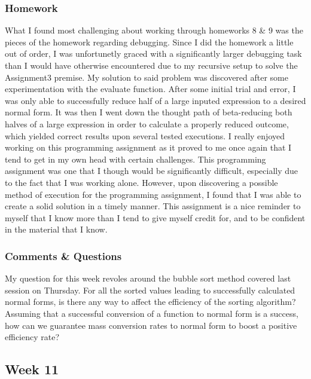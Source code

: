 \documentclass{article}
\theoremstyle{theorem}
\theoremstyle{definition}
\theoremstyle{remark}
\begin{document}
\subsubsection{Homework}
What I found most challenging about working through homeworks 8 \& 9 was the pieces of the homework regarding debugging. Since I did the homework a little out of order, I was unfortunetly graced with a significantly larger debugging task than I would have otherwise encountered due to my recursive setup to solve the Assignment3 premise.
\newline \newline My solution to said problem was discovered after some experimentation with the evaluate function. After some initial trial and error, I was only able to successfully reduce half of a large inputed expression to a desired normal form. It was then I went down the thought path of beta-reducing both halves of a large expression in order to calculate a properly reduced outcome, which yielded correct results upon several tested executions.
\newline \newline I really enjoyed working on this programming assignment as it proved to me once again that I tend to get in my own head with certain challenges. This programming assignment was one that I though would be significantly difficult, especially due to the fact that I was working alone. However, upon discovering a possible method of execution for the programming assignment, I found that I was able to create a solid solution in a timely manner. This assignment is a nice reminder to myself that I know more than I tend to give myself credit for, and to be confident in the material that I know.

\subsubsection{Comments \& Questions}

My question for this week revoles around the bubble sort method covered last session on Thursday. For all the sorted values leading to successfully calculated normal forms, is there any way to affect the efficiency of the sorting algorithm? Assuming that a successful conversion of a function to normal form is a success, how can we guarantee mass conversion rates to normal form to boost a positive efficiency rate?

\subsection{Week 11}
\end{document}
